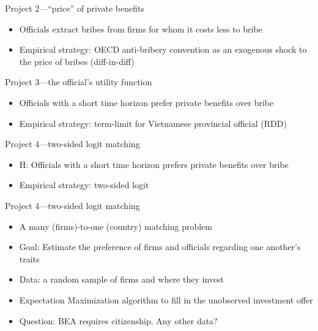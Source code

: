 \documentclass[14pt]{beamer}
\begin{document}
\begin{frame}{Project 2---``price'' of private benefits}
\begin{itemize}
\item<1-> Officials extract bribes from firms for whom it costs less to bribe
\item<2-> Empirical strategy: OECD anti-bribery convention as an exogenous shock to the price of bribes (diff-in-diff)
\end{itemize}
\end{frame}

\begin{frame}{Project 3---the official's utility function}
\begin{itemize}
\item<1-> Officials with a short time horizon prefer private benefits over bribe
\item<2-> Empirical strategy: term-limit for Vietnamese provincial official (RDD)
\end{itemize}
\end{frame}

\begin{frame}{Project 4---two-sided logit matching}
\begin{itemize}
\item<1-> H: Officials with a short time horizon prefers private benefits over bribe
\item<2-> Empirical strategy: two-sided logit
\end{itemize}
\end{frame}

\begin{frame}{Project 4---two-sided logit matching}
\begin{itemize}[<+->]
\item A many (firms)-to-one (country) matching problem
\item Goal: Estimate the preference of firms and officials regarding one another's traits
\item Data: a random sample of firms and where they invest
\item Expectation Maximization algorithm to fill in the unobserved investment offer
\item Question: BEA requires citizenship. Any other data?
\end{itemize}
\end{frame}

\begin{frame}
\footnotesize


\end{frame}
\end{document}
